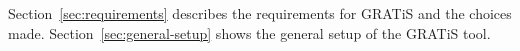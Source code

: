 Section~\ref{sec:requirements} describes the requirements for GRATiS and the choices made. Section~\ref{sec:general-setup} shows the general setup of the GRATiS tool. 
